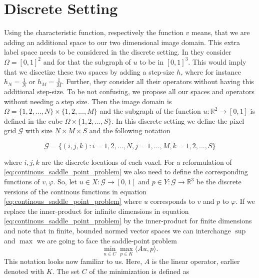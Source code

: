 \section{Discrete Setting} %
\label{sec:discrete_setting_ms}

    Using the characteristic function, respectively the function $v$ means, that we are adding an additional space to our two dimensional image domain. This extra label space needs to be considered in the discrete setting. In \cite{Pock-et-al-iccv09} they consider $\Omega = [0, 1]^{2}$ and for that the subgraph of $u$ to be in $[0, 1]^{3}$. This would imply that we discetize these two spaces by adding a step-size $h$, where for instance $h_{N} = \frac{1}{N}$ or $h_{M} = \frac{1}{M}$. Further, they consider all their operators without having this additional step-size. To be not confusing, we propose all our spaces and operators without needing a step size. Then the image domain is $\Omega = \{1, 2, ..., N\} \times \{1, 2, ..., M\}$ and the subgraph of the function $u: \mathbb{R}^{2} \longrightarrow [0, 1]$ is defined in the cube $\Omega \times \{1, 2, ..., S\}$. In this discrete setting we define the pixel grid $\mathcal{G}$ with size $N \times M \times S$ and the following notation

        \begin{equation}
            \mathcal{G} = \bigg\{ (i , j , k ): i = 1, 2, ..., N, j = 1, ..., M, k = 1, 2, ..., S \bigg\}
        \end{equation}

    where $i, j, k$ are the discrete locations of each voxel. For a reformulation of \ref{eq:continous_saddle_point_problem} we also need to define the corresponding functions of $v, \varphi$. So, let $u \in X: \mathcal{G} \longrightarrow [0, 1]$ and $p \in Y: \mathcal{G} \longrightarrow \mathbb{R}^{3}$ be the discrete versions of the continous functions in equation \ref{eq:continous_saddle_point_problem} where $u$ corresponds to $v$ and $p$ to $\varphi$. If we replace the inner-product for infinite dimensions in equation \ref{eq:continous_saddle_point_problem} by the inner-product for finite dimensions and note that in finite, bounded normed vector spaces we can interchange $\sup$ and $\max$ we are going to face the saddle-point problem
        \begin{equation}
            \min_{u \in C} \max_{p \in K} \langle Au, p \rangle.
        \label{eq:mumford_shah_saddle_point_problem}
        \end{equation}
    This notation looks now familiar to us. Here, $A$ is the linear operator, earlier denoted with $K$. The set $C$ of the minimization is defined as

